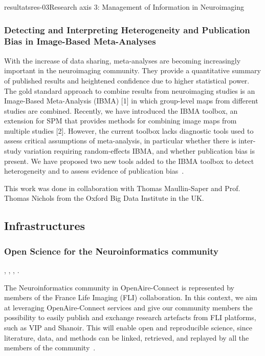 \documentclass{ra2018}
\begin{document}
\begin{module}{resultats}{res-03}{Research axis 3: Management of Information in Neuroimaging}
\subsubsection{Detecting and Interpreting Heterogeneity and Publication Bias in Image-Based Meta-Analyses}
\begin{participants}
\end{participants}
With the increase of data sharing, meta-analyses are becoming increasingly important in the neuroimaging community. They provide a quantitative summary of published results and heightened confidence due to higher statistical power. The gold standard approach to combine results from neuroimaging studies is an Image-Based Meta-Analysis (IBMA) [1] in which group-level maps from different studies are combined. Recently, we have introduced the IBMA toolbox, an extension for SPM that provides methods for combining image maps from multiple studies [2]. However, the current toolbox lacks diagnostic tools used to assess critical assumptions of meta-analysis, in particular whether there is inter-study variation requiring random-effects IBMA, and whether publication bias is present. We have proposed two new tools added to the IBMA toolbox to detect heterogeneity and to assess evidence of publication bias~\cite{maullinsapey:inserm-01933023}.

This work was done in collaboration with Thomas Maullin-Saper and Prof. Thomas Nichols from the Oxford Big Data Institute in the UK.

\subsection{Infrastructures}
\subsubsection{Open Science for the Neuroinformatics community}
\begin{participants}
      ,
      ,
      ,
      .
\end{participants}
The Neuroinformatics community in OpenAire-Connect is represented by members of the France Life Imaging (FLI) collaboration. In this context, we aim at leveraging OpenAire-Connect services and give our community members the possibility to easily publish and exchange research artefacts from FLI platforms, such as VIP and Shanoir. This will enable open and reproducible science, since literature, data, and methods can be linked, retrieved, and replayed by all the members of the community~\cite{camarasupop:inserm-01846994}.


\end{module}
\end{document}
